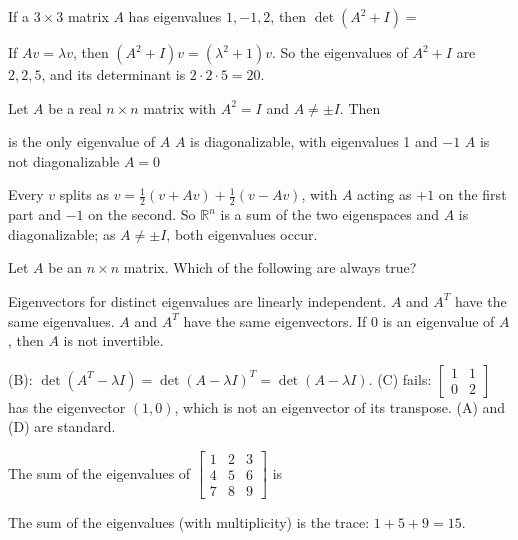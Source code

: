 \begin{question}[id=eig-7, marks=2]
If a $3 \times 3$ matrix $A$ has eigenvalues $1, -1, 2$, then $\det(A^2 + I) =$
\begin{solution}
If $Av = \lambda v$, then $(A^2 + I)v = (\lambda^2 + 1)v$. So the eigenvalues of $A^2 + I$ are $2, 2, 5$, and its determinant is $2 \cdot 2 \cdot 5 = 20$.
\end{solution}
\end{question}

\begin{question}[id=eig-8, marks=2]
Let $A$ be a real $n \times n$ matrix with $A^2 = I$ and $A \ne \pm I$. Then
\begin{options}
   is the only eigenvalue of $A$
  \correct $A$ is diagonalizable, with eigenvalues 1 and $-1$
  \option $A$ is not diagonalizable
  \option $A = 0$
\end{options}
\begin{solution}
Every $v$ splits as $v = \tfrac{1}{2}(v + Av) + \tfrac{1}{2}(v - Av)$, with $A$ acting as $+1$ on the first part and $-1$ on the second. So $\mathbb{R}^n$ is a sum of the two eigenspaces and $A$ is diagonalizable; as $A \ne \pm I$, both eigenvalues occur.
\end{solution}
\end{question}

\begin{question}[id=eig-9, type=msq, marks=2]
Let $A$ be an $n \times n$ matrix. Which of the following are always true?
\begin{options}
  \correct Eigenvectors for distinct eigenvalues are linearly independent.
  \correct $A$ and $A^T$ have the same eigenvalues.
  \option $A$ and $A^T$ have the same eigenvectors.
  \correct If 0 is an eigenvalue of $A$, then $A$ is not invertible.
\end{options}
\begin{solution}
(B): $\det(A^T - \lambda I) = \det(A - \lambda I)^T = \det(A - \lambda I)$. (C) fails: $\begin{bmatrix} 1 & 1 \\ 0 & 2 \end{bmatrix}$ has the eigenvector $(1, 0)$, which is not an eigenvector of its transpose. (A) and (D) are standard.
\end{solution}
\end{question}

\begin{question}[id=eig-10]
The sum of the eigenvalues of $\begin{bmatrix} 1 & 2 & 3 \\ 4 & 5 & 6 \\ 7 & 8 & 9 \end{bmatrix}$ is
\begin{solution}
The sum of the eigenvalues (with multiplicity) is the trace: $1 + 5 + 9 = 15$.
\end{solution}
\end{question}

